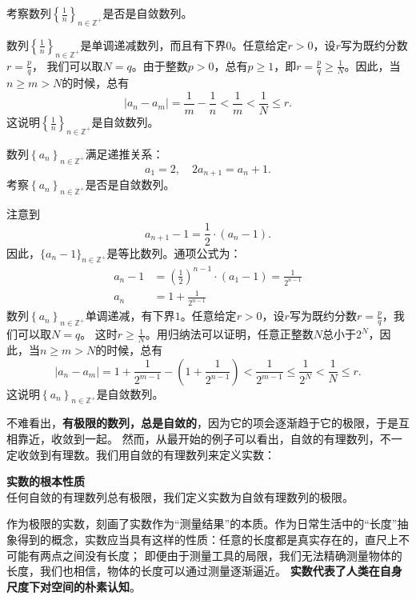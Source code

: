 \documentclass[12pt,UTF8,fontset=none]{ctexbook}
\begin{document}
\begin{et} 
    考察数列$\left\{\frac{1}{n}\right\}_{n\in\mathbb{Z}^+}$是否是自敛数列。\\
\end{et}
\begin{so}
    数列$\left\{\frac{1}{n}\right\}_{n\in\mathbb{Z}^+}$是单调递减数列，而且有下界$0$。任意给定$r>0$，设$r$写为既约分数$r = \frac{p}{q}$，
    我们可以取$N = q$。由于整数$p > 0$，总有$p \geqslant 1$，即$r = \frac{p}{q} \geqslant \frac{1}{N}$。因此，当$n\geqslant m>N$的时候，总有
    $$|a_n - a_m| = \frac{1}{m} - \frac{1}{n} < \frac{1}{m} < \frac{1}{N} \leqslant r.$$
    这说明$\left\{\frac{1}{n}\right\}_{n\in\mathbb{Z}^+}$是自敛数列。
\end{so}
\begin{et} 
    数列$\left\{a_n\right\}_{n\in\mathbb{Z}^+}$满足递推关系：
    $$a_1 = 2, \quad 2a_{n+1} = a_n + 1.$$
    \indent 考察$\left\{a_n\right\}_{n\in\mathbb{Z}^+}$是否是自敛数列。\\
\end{et}
\begin{so}
    注意到
    $$ a_{n+1} - 1 = \frac{1}{2}\cdot (a_n - 1). $$
    因此，$\{a_n - 1\}_{n\in\mathbb{Z}^+}$是等比数列。通项公式为：
    \begin{align*}
        a_n - 1 &= \left(\frac12\right)^{n-1}\cdot (a_1 - 1) = \frac{1}{2^{n-1}}  \\
        a_n &= 1 + \frac{1}{2^{n-1}} 
    \end{align*}
    数列$\left\{a_n\right\}_{n\in\mathbb{Z}^+}$单调递减，有下界$1$。任意给定$r>0$，设$r$写为既约分数$r = \frac{p}{q}$，我们可以取$N = q$。
    这时$r \geqslant \frac{1}{N}$。用归纳法可以证明，任意正整数$N$总小于$2^N$，因此，当$n\geqslant m>N$的时候，总有
    $$|a_n - a_m| = 1 + \frac{1}{2^{m-1}} - \left(1 + \frac{1}{2^{n-1}} \right) < \frac{1}{2^{m-1}} \leqslant \frac{1}{2^N} < \frac{1}{N} \leqslant r.$$
    这说明$\left\{a_n\right\}_{n\in\mathbb{Z}^+}$是自敛数列。
\end{so}

不难看出，\textbf{有极限的数列，总是自敛的}，因为它的项会逐渐趋于它的极限，于是互相靠近，收敛到一起。
然而，从最开始的例子可以看出，自敛的有理数列，不一定收敛到有理数。我们用自敛的有理数列来定义实数：
\begin{po}\textbf{实数的根本性质}\\
    任何自敛的有理数列总有极限，我们定义实数为自敛有理数列的极限。
\end{po}

作为极限的实数，刻画了实数作为“测量结果”的本质。作为日常生活中的“长度”抽象得到的概念，实数应当具有这样的性质：任意的长度都是真实存在的，直尺上不可能有两点之间没有长度；
即便由于测量工具的局限，我们无法精确测量物体的长度，我们也相信，物体的长度可以通过测量逐渐逼近。
\textbf{实数代表了人类在自身尺度下对空间的朴素认知}。
\end{document}
